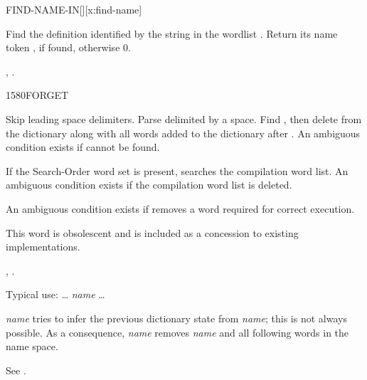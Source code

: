\begin{worddef}{}{FIND-NAME-IN}[][x:find-name]
\item {}

Find the definition identified by the string  in the wordlist
.  Return its name token , if found, otherwise 0.

\see {},
	.

\begin{implement}
\end{implement}

\begin{testing}
\end{testing}
\end{worddef}

\pagebreak
\begin{worddef}{1580}{FORGET}
\item {}

	Skip leading space delimiters. Parse  delimited by a
	space. Find , then delete  from the
	dictionary along with all words added to the dictionary after
	. An ambiguous condition exists if  cannot
	be found.

	If the Search-Order word set is present,  searches
	the compilation word list. An ambiguous condition exists if the
	compilation word list is deleted.

	An ambiguous condition exists if  removes a word
	required for correct execution.

\note This word is obsolescent and is included as a concession to
	existing implementations.

\see {},
	.

	\begin{rationale} %
		Typical use:
			{\ldots}  \emph{name} {\ldots}

		 \emph{name} tries to infer the previous dictionary
		state from \emph{name}; this is not always possible.  As a
		consequence,  \emph{name} removes \emph{name} and
		all following words in the name space.

		See .
	\end{rationale}
\end{worddef}

